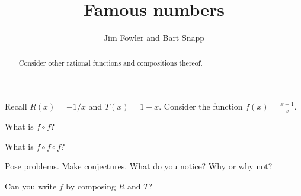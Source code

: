 \documentclass{ximera}
\title{Famous numbers}
\author{Jim Fowler and Bart Snapp}
\begin{document}
\begin{abstract}
  Consider other rational functions and compositions thereof.
\end{abstract}

\maketitle

Recall $R(x) = -1/x$ and $T(x) = 1+x$.  Consider the function $f(x) = \frac{x+1}{x}$.

\begin{question}
  What is $f \circ f$?

  \begin{freeResponse}
  \end{freeResponse}
\end{question}

\begin{question}
  What is $f \circ f \circ f$?

  \begin{freeResponse}
  \end{freeResponse}
\end{question}

\begin{question}
  Pose problems.  Make conjectures.  What do you notice?  Why or why not?

  \begin{freeResponse}
  \end{freeResponse}
\end{question}

\begin{question}
  Can you write $f$ by composing $R$ and $T$?

  \begin{freeResponse}
  \end{freeResponse}
\end{question}
\end{document}
